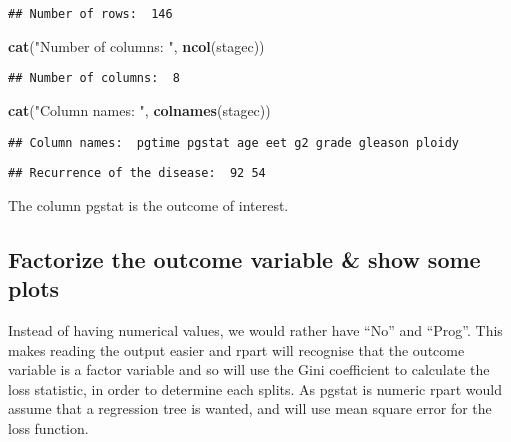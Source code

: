 \documentclass[]{article}
\newenvironment{Shaded}{\begin{snugshade}}{\end{snugshade}}
\newcommand{\KeywordTok}[1]{\textcolor[rgb]{0.13,0.29,0.53}{\textbf{#1}}}
\newcommand{\NormalTok}[1]{#1}
\newcommand{\OperatorTok}[1]{\textcolor[rgb]{0.81,0.36,0.00}{\textbf{#1}}}
\newcommand{\StringTok}[1]{\textcolor[rgb]{0.31,0.60,0.02}{#1}}
\begin{document}
\begin{verbatim}
## Number of rows:  146
\end{verbatim}

\begin{Shaded}
\begin{Highlighting}[]
\KeywordTok{cat}\NormalTok{(}\StringTok{"Number of columns: "}\NormalTok{, }\KeywordTok{ncol}\NormalTok{(stagec)) }
\end{Highlighting}
\end{Shaded}

\begin{verbatim}
## Number of columns:  8
\end{verbatim}

\begin{Shaded}
\begin{Highlighting}[]
\KeywordTok{cat}\NormalTok{(}\StringTok{"Column names: "}\NormalTok{, }\KeywordTok{colnames}\NormalTok{(stagec)) }
\end{Highlighting}
\end{Shaded}

\begin{verbatim}
## Column names:  pgtime pgstat age eet g2 grade gleason ploidy
\end{verbatim}

\begin{Shaded}
\end{Shaded}

\begin{verbatim}
## Recurrence of the disease:  92 54
\end{verbatim}

The column pgstat is the outcome of interest.

\hypertarget{factorize-the-outcome-variable-show-some-plots}{%
\subsection{Factorize the outcome variable \& show some
plots}\label{factorize-the-outcome-variable-show-some-plots}}

Instead of having numerical values, we would rather have ``No'' and
``Prog''. This makes reading the output easier and rpart will recognise
that the outcome variable is a factor variable and so will use the Gini
coefficient to calculate the loss statistic, in order to determine each
splits. As pgstat is numeric rpart would assume that a regression tree
is wanted, and will use mean square error for the loss function.
\end{document}
